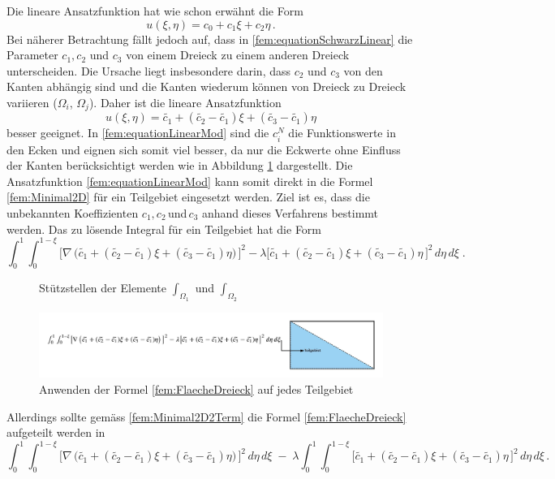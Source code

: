 Die lineare Ansatzfunktion hat wie schon erwähnt die Form
\begin{equation}
u(\xi, \eta) = c_0 + c_1 \xi + c_2 \eta \, .
\label{fem:equationSchwarzLinear}
\end{equation}
Bei näherer Betrachtung fällt jedoch auf, dass in \eqref{fem:equationSchwarzLinear} die Parameter $c_1, c_2$ und $c_3$ von einem Dreieck zu einem anderen Dreieck unterscheiden. Die Ursache liegt insbesondere darin, dass $c_2$ und $c_3$ von den Kanten abhängig sind und die Kanten wiederum können von Dreieck zu Dreieck variieren ($\Omega_i$, $\Omega_j$). Daher ist die lineare Ansatzfunktion 
\begin{equation}
u(\xi, \eta) = \tilde{c_1} + (\tilde{c_2} -\tilde{c_1})\xi + (\tilde{c_3} - \tilde{c_1})\eta
\label{fem:equationLinearMod}
\end{equation}
besser geeignet. In \eqref{fem:equationLinearMod} sind die $c_i^N$ die Funktionswerte in den Ecken und eignen sich somit viel besser, da nur die Eckwerte ohne Einfluss der Kanten berücksichtigt werden wie in Abbildung \ref{fem:Stuestellen} dargestellt. Die Ansatzfunktion \eqref{fem:equationLinearMod} kann somit direkt in die Formel \eqref{fem:Minimal2D} für ein Teilgebiet eingesetzt werden. Ziel ist es, dass die unbekannten Koeffizienten $c_1, c_2 \, $und$ \, c_3$ anhand dieses Verfahrens bestimmt werden. Das zu lösende Integral für ein Teilgebiet hat die Form
\begin{equation}
\int_0^1 \int_0^{1 - \xi} \bigl[ \nabla \, \bigl( \tilde{c_1} + (\tilde{c_2} - \tilde{c_1})\xi + (\tilde{c_3} - \tilde{c_1})\eta \bigr) \, \bigr]^2 - \lambda \bigl[\tilde{c_1} + (\tilde{c_2} - \tilde{c_1})\xi + (\tilde{c_3} -\tilde{c_1})\eta \, \bigr]^2 \, d \eta \, d \xi \; .
\label{fem:FlaecheDreieck}
\end{equation}
\begin{figure}[h]
	\centering
	
	\caption{Stützstellen der Elemente $\int_{\Omega_1}$ und $\int_{\Omega_2}$ }
	\label{fem:Stuestellen}
\end{figure} 
\begin{figure}[h!]
	\centering
	\includegraphics[scale=0.6]{papers/fem/Images/FoTeilgebiet.jpeg}
	\caption{Anwenden der Formel \eqref{fem:FlaecheDreieck} auf jedes Teilgebiet}
	\label{fig:schemNMR_vorlage}
\end{figure}
Allerdings sollte gemäss \eqref{fem:Minimal2D2Term} die Formel \eqref{fem:FlaecheDreieck} aufgeteilt werden in
\begin{equation}
\int_0^1 \int_0^{1 - \xi} \bigl[ \nabla \, \bigl( \tilde{c_1} + (\tilde{c_2} - \tilde{c_1})\xi + (\tilde{c_3} - \tilde{c_1})\eta \bigr) \, \bigr]^2 \, d \eta \, d \xi \; - \; \lambda \int_0^1 \int_0^{1 - \xi} \bigl[\tilde{c_1} + (\tilde{c_2} - \tilde{c_1})\xi + (\tilde{c_3} - \tilde{c_1})\eta \, \bigr]^2 \, d \eta  \, d \xi \, .
\label{fem:IntInt}
\end{equation}

